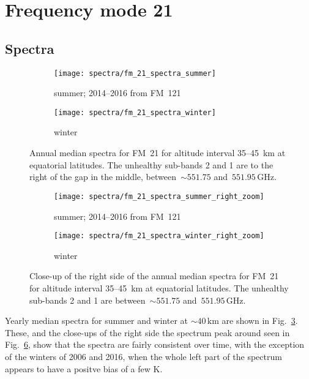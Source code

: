 \section{Frequency mode 21}
\label{FM21}

\subsection{Spectra}
\label{FM21:spectra}

\begin{figure}[ht]
    \centering
    \begin{subfigure}[b]{0.9545\textwidth}
        \texttt{[image: spectra/fm\_21\_spectra\_summer]}
        \caption{summer; 2014--2016 from FM~121}\label{fig:spectra:21:summer}
    \end{subfigure}
    \begin{subfigure}[b]{0.9545\textwidth}
        \texttt{[image: spectra/fm\_21\_spectra\_winter]}
        \caption{winter}\label{fig:spectra:21:winter}
    \end{subfigure}
    \caption{Annual median spectra for FM~21 for altitude interval 35--45~km at
        equatorial latitudes. The unhealthy sub-bands 2 and 1 are to the right
        of the gap in the middle, between~$\sim551.75$
        and~$551.95\,\mathrm{GHz}$.
        }\label{fig:spectra:21}
\end{figure}

\begin{figure}[ht]
    \centering
    \begin{subfigure}[b]{0.9545\textwidth}
        \texttt{[image: spectra/fm\_21\_spectra\_summer\_right\_zoom]}
        \caption{summer; 2014--2016 from
            FM~121}\label{fig:spectra:21:summer:closeup}
    \end{subfigure}
    \begin{subfigure}[b]{0.9545\textwidth}
        \texttt{[image: spectra/fm\_21\_spectra\_winter\_right\_zoom]}
        \caption{winter}\label{fig:spectra:21:winter:closeup}
    \end{subfigure}
    \caption{Close-up of the right side of the annual median spectra for
        FM~21 for altitude interval 35--45~km at equatorial latitudes.  The
        unhealthy sub-bands 2 and 1 are between~$\sim551.75$
        and~$551.95\,\mathrm{GHz}$.
        }\label{fig:spectra:21:closeup}
\end{figure}

\noindent
Yearly median spectra for summer and winter at $\sim40\,\mathrm{km}$ are shown
in Fig.~\ref{fig:spectra:21}.  These, and the close-ups of the right side the
spectrum peak around seen in Fig.~\ref{fig:spectra:21:closeup}, show that the
spectra are fairly consistent over time, with the exception of the winters of
2006 and 2016, when the whole left part of the spectrum appears to have a
positve bias of a few $\mathrm{K}$.

